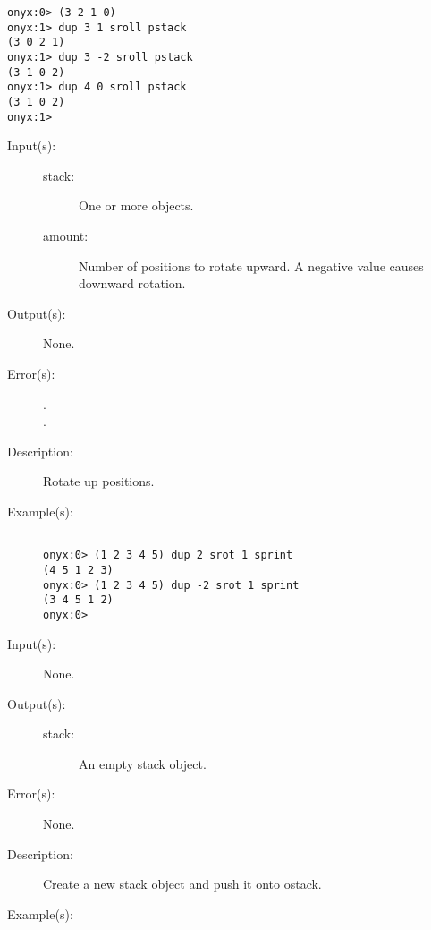 \begin{description}
\begin{description}
\begin{verbatim}
onyx:0> (3 2 1 0)
onyx:1> dup 3 1 sroll pstack
(3 0 2 1)
onyx:1> dup 3 -2 sroll pstack
(3 1 0 2)
onyx:1> dup 4 0 sroll pstack
(3 1 0 2)
onyx:1>
		\end{verbatim}
	\end{description}
\label{systemdict:srot}
\item[{\onyxop{stack amount}{srot}{--}}: ]
	\begin{description}\item[]
	\item[Input(s): ]
		\begin{description}\item[]
		\item[stack: ]
			One or more objects.
		\item[amount: ]
			Number of positions to rotate  upward.  A
			negative value causes downward rotation.
		\end{description}
	\item[Output(s): ] None.
	\item[Error(s): ]
		\begin{description}\item[]
		\item[.]
		\item[.]
		\end{description}
	\item[Description: ]
		Rotate  up  positions.
	\item[Example(s): ]\begin{verbatim}

onyx:0> (1 2 3 4 5) dup 2 srot 1 sprint
(4 5 1 2 3)
onyx:0> (1 2 3 4 5) dup -2 srot 1 sprint
(3 4 5 1 2)
onyx:0>
		\end{verbatim}
	\end{description}
\label{systemdict:stack}
\item[{\onyxop{--}{stack}{stack}}: ]
	\begin{description}\item[]
	\item[Input(s): ] None.
	\item[Output(s): ]
		\begin{description}\item[]
		\item[stack: ]
			An empty stack object.
		\end{description}
	\item[Error(s): ] None.
	\item[Description: ]
		Create a new stack object and push it onto ostack.
	\item[Example(s): ]\begin{verbatim}


\end{verbatim}
\end{description}
\end{description}
